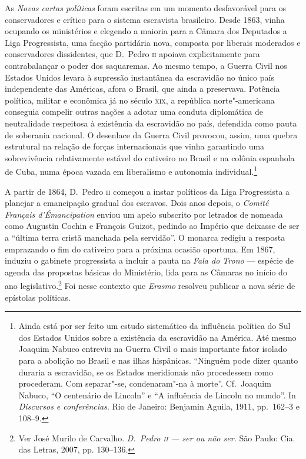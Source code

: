 As \textit{Novas cartas políticas} foram escritas em um momento
desfavorável para os conservadores e crítico para o sistema escravista
brasileiro. Desde 1863, vinha ocupando os ministérios e elegendo a maioria 
para a Câmara dos Deputados a Liga Progressista, uma facção partidária nova, 
composta por liberais moderados e conservadores dissidentes, que D.~Pedro \textsc{ii} 
apoiava explicitamente para contrabalançar o poder dos saquaremas.
Ao mesmo tempo, a Guerra Civil
nos Estados Unidos levara à  supressão instantânea da escravidão no
único país independente das Américas, afora o Brasil, que ainda a
preservava. Potência política, militar e econômica já no século \textsc{xix}, a
república norte"-americana conseguia compelir outras nações a adotar
uma conduta \mbox{diplomática} de neutralidade respeitosa à  existência da
escravidão no país, defendida como pauta de soberania nacional. O
desenlace da Guerra Civil provocou, assim, uma quebra estrutural na
relação de forças internacionais que vinha garantindo uma sobrevivência
relativamente estável do cativeiro no Brasil e na colônia espanhola de
Cuba, numa época vazada em liberalismo e autonomia
individual.\footnote{ Ainda está por ser feito um estudo sistemático da
influência política do Sul dos Estados Unidos sobre a existência da
escravidão na América. Até mesmo Joaquim Nabuco entreviu na Guerra
Civil o mais importante fator isolado para a abolição no Brasil e nas
ilhas hispânicas. ``Ninguém pode dizer quanto duraria a escravidão, se
os Estados meridionais não procedessem como procederam. Com
separar"-se, condenaram"-na à  morte''. Cf.~Joaquim Nabuco, ``O
centenário de Lincoln'' e ``A influência de Lincoln no mundo''. In
\textit{Discursos e conferências}. Rio de Janeiro: Benjamin
Aguila, 1911, pp.~162--3 e 108--9.} 

A partir de 1864, D.~Pedro \textsc{ii} começou a instar políticos da Liga
Progressista a planejar a emancipação gradual dos escravos. Dois anos
depois, o \textit{Comité Français d'Émancipation} enviou um apelo
subscrito por letrados de nomeada como Augustin Cochin e François
Guizot, pedindo ao Império que deixasse de ser a ``última terra cristã
manchada pela servidão''. O monarca redigiu a resposta emprazando o fim
do cativeiro para a próxima ocasião oportuna. Em 1867, induziu o
gabinete progressista a incluir a pauta na \textit{Fala do Trono} ---
espécie de agenda das propostas básicas do Ministério, lida para as
Câmaras no início do ano legislativo.\footnote{ Ver José Murilo de Carvalho. 
\textit{D.~Pedro \textsc{ii} --- ser ou não ser.} São Paulo: Cia. das Letras, 2007, pp. 130--136.} Foi
nesse contexto que \textit{Erasmo} resolveu publicar a nova série de epístolas políticas. 

